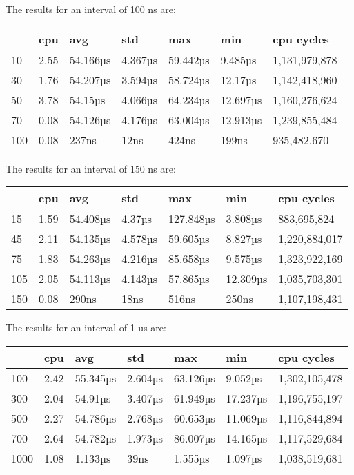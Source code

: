 \documentclass{article}
\begin{document}
The results for an interval of 100  ns are: \\
\begin{tabular}{lllllll}
\toprule
 & cpu & avg & std & max & min & cpu cycles \\
\midrule
10 & 2.55 & 54.166µs & 4.367µs & 59.442µs & 9.485µs & 1,131,979,878 \\
30 & 1.76 & 54.207µs & 3.594µs & 58.724µs & 12.17µs & 1,142,418,960 \\
50 & 3.78 & 54.15µs & 4.066µs & 64.234µs & 12.697µs & 1,160,276,624 \\
70 & 0.08 & 54.126µs & 4.176µs & 63.004µs & 12.913µs & 1,239,855,484 \\
100 & 0.08 & 237ns & 12ns & 424ns & 199ns & 935,482,670 \\
\bottomrule
\end{tabular}


The results for an interval of 150 ns are: \\
\begin{tabular}{lllllll}
\toprule
 & cpu & avg & std & max & min & cpu cycles \\
\midrule
15 & 1.59 & 54.408µs & 4.37µs & 127.848µs & 3.808µs & 883,695,824 \\
45 & 2.11 & 54.135µs & 4.578µs & 59.605µs & 8.827µs & 1,220,884,017 \\
75 & 1.83 & 54.263µs & 4.216µs & 85.658µs & 9.575µs & 1,323,922,169 \\
105 & 2.05 & 54.113µs & 4.143µs & 57.865µs & 12.309µs & 1,035,703,301 \\
150 & 0.08 & 290ns & 18ns & 516ns & 250ns & 1,107,198,431 \\
\bottomrule
\end{tabular}


The results for an interval of 1 us are: \\
\begin{tabular}{lllllll}
\toprule
 & cpu & avg & std & max & min & cpu cycles \\
\midrule
100 & 2.42 & 55.345µs & 2.604µs & 63.126µs & 9.052µs & 1,302,105,478 \\
300 & 2.04 & 54.91µs & 3.407µs & 61.949µs & 17.237µs & 1,196,755,197 \\
500 & 2.27 & 54.786µs & 2.768µs & 60.653µs & 11.069µs & 1,116,844,894 \\
700 & 2.64 & 54.782µs & 1.973µs & 86.007µs & 14.165µs & 1,117,529,684 \\
1000 & 1.08 & 1.133µs & 39ns & 1.555µs & 1.097µs & 1,038,519,681 \\
\bottomrule
\end{tabular}
\end{document}
